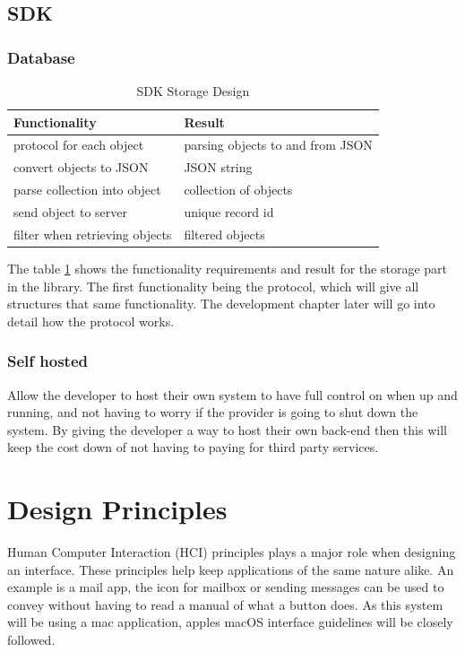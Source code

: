 \subsection{SDK}

\subsubsection{Database}

\begin{table}[!h]
\centering
\caption{SDK Storage Design}
\label{tb:storage_design}
\begin{tabular}{|l|l|}
\hline
\rowcolor{green!20}
Functionality                  & Result                \\ \hline
protocol for each object       & parsing objects to and from JSON \\ \hline
convert objects to JSON        & JSON string \\ \hline
parse collection into object   & collection of objects \\ \hline
send object to server          & unique record id      \\ \hline
filter when retrieving objects & filtered objects      \\ \hline
\end{tabular}
\end{table}

The table \ref{tb:storage_design} shows the functionality requirements and result for the storage part in the library. The first functionality being the protocol, which will give all structures that same functionality. The development chapter later will go into detail how the protocol works.

\subsubsection{Self hosted}
Allow the developer to host their own system to have full control on when up and running, and not having to worry if the provider is going to shut down the system. By giving the developer a way to host their own back-end then this will keep the cost down of not having to paying for third party services.

\section{Design Principles}
Human Computer Interaction (HCI) principles plays a major role when designing an interface. These principles help keep applications of the same nature alike. An example is a mail app, the icon for mailbox or sending messages can be used to convey without having to read a manual of what a button does. As this system will be using a mac application, apples macOS interface guidelines will be closely followed.

